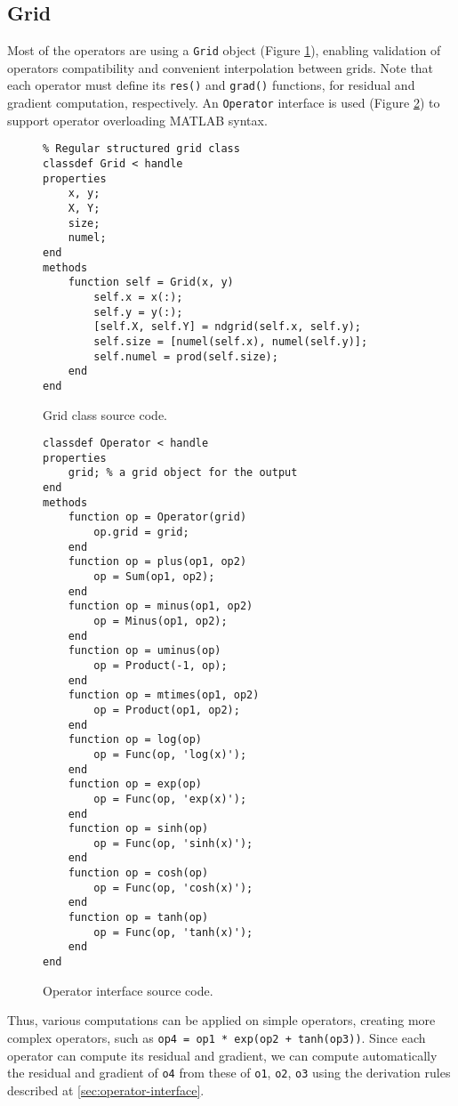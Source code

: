 \documentclass[MSc,beforeExam]{iitcsthesis}
\begin{document}
\subsection{Grid}
Most of the operators are using a \verb|Grid| object (Figure \ref{fig:grid.m}),
enabling validation of operators compatibility and 
convenient interpolation between grids. Note that
each operator must define its \verb|res()| and \verb|grad()|
functions, for residual and gradient computation, respectively.
An \verb|Operator| interface is used (Figure \ref{fig:operator.m}) 
to support operator overloading MATLAB syntax.
\begin{figure}[h]
\begin{lstlisting}
% Regular structured grid class
classdef Grid < handle
properties
    x, y;
    X, Y;
    size;    
    numel;
end
methods
    function self = Grid(x, y)
        self.x = x(:);
        self.y = y(:);
        [self.X, self.Y] = ndgrid(self.x, self.y);
        self.size = [numel(self.x), numel(self.y)];
        self.numel = prod(self.size);
    end
end
\end{lstlisting}
\caption{Grid class source code.} \label{fig:grid.m}
\end{figure}
\begin{figure}[h]
\begin{lstlisting}
classdef Operator < handle
properties
    grid; % a grid object for the output
end
methods
    function op = Operator(grid)
        op.grid = grid;
    end
    function op = plus(op1, op2)
        op = Sum(op1, op2);
    end
    function op = minus(op1, op2)
        op = Minus(op1, op2);
    end
    function op = uminus(op)
        op = Product(-1, op);
    end
    function op = mtimes(op1, op2)
        op = Product(op1, op2);
    end
    function op = log(op)
        op = Func(op, 'log(x)');
    end
    function op = exp(op)
        op = Func(op, 'exp(x)');
    end
    function op = sinh(op)
        op = Func(op, 'sinh(x)');
    end
    function op = cosh(op)
        op = Func(op, 'cosh(x)');
    end
    function op = tanh(op)
        op = Func(op, 'tanh(x)');
    end
end
\end{lstlisting}
\caption{Operator interface source code.} \label{fig:operator.m}
\end{figure}

Thus, various computations can be applied on simple operators, 
creating more complex operators, such as
\verb|op4 = op1 * exp(op2 + tanh(op3))|. 
Since each operator can compute its residual and gradient, we
can compute automatically the residual and gradient of \verb|o4|
from these of \verb|o1|, \verb|o2|, \verb|o3| using the derivation
rules described at \ref{sec:operator-interface}.
\end{document}
